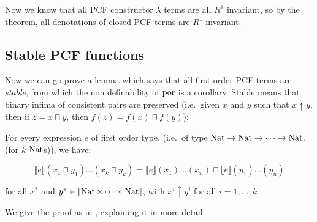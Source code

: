Now we know that all PCF constructor $\lambda$ terms are all $R^1$ invariant, so by the theorem, all denotations of closed PCF terms are $R^1$ invariant. 

\subsection{Stable PCF functions}

Now we can go prove a lemma which says that all first order PCF terms are \emph{stable}, from which the non definability of $\operatorname{por}$ is a corollary. Stable means that binary infima of consistent pairs are preserved (i.e.\ given $x$ and $y$ such that $x \uparrow y$, then if $z = x \sqcap y$, then $f(z) = f(x) \sqcap f(y)$):

\vspace{0.5cm}

\begin{lem}{\citep{Streicher06}}\label{stable}
For every expression $e$ of first order type, (i.e.\ of type $\operatorname{Nat} \to \operatorname{Nat} \to \dots \to \operatorname{Nat}$, (for $k$ $\operatorname{Nat}$s)), we have:

\[ \llbracket e \rrbracket (x_1 \sqcap y_1) \dots (x_k \sqcap y_k)  =  \llbracket e \rrbracket(x_1) \dots (x_n) \sqcap \llbracket e \rrbracket(y_1) \dots (y_n)\]

for all $x^*$ and $y^* \in \llbracket \operatorname{Nat} \times \dots \times \operatorname{Nat} \rrbracket$, with $x^i \uparrow y^i$ for all $i = 1, \dots , k$ 
\end{lem}

We give the proof as in \citep{Streicher06}, explaining it in more detail:


